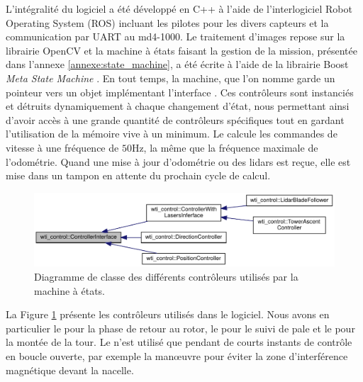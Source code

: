 L'intégralité du logiciel a été développé en C++ à l'aide de l'interlogiciel
Robot Operating System (ROS) incluant les pilotes pour les divers capteurs et la communication par UART au md4-1000. Le traitement d'images repose sur la librairie OpenCV \citep{itseez2015} et la machine à états faisant la gestion de la mission, présentée dans l'annexe \ref{annexe:state_machine}, a été écrite à l'aide de la librairie Boost \textit{Meta State Machine} \citep{Schling2011}. En tout temps, la machine, que l'on nomme  garde un pointeur vers un objet implémentant l'interface . Ces contrôleurs sont instanciés et détruits dynamiquement à chaque changement d'état, nous permettant ainsi d'avoir accès à une grande quantité de contrôleurs spécifiques tout en gardant l'utilisation de la mémoire vive à un minimum. Le  calcule les commandes de vitesse à une fréquence de $50$Hz, la même que la fréquence maximale de l'odométrie. Quand une mise à jour d'odométrie ou des lidars est reçue, elle est mise dans un tampon en attente du prochain cycle de calcul.

\begin{figure}[htbp]
  \centering
  \includegraphics[width=\linewidth]{images/uml_controller.pdf}
  \caption{Diagramme de classe des différents contrôleurs utilisés par la machine à états.}
  \label{fig:uml_controller}
\end{figure}

La Figure \ref{fig:uml_controller} présente les contrôleurs utilisés dans le logiciel. Nous avons en particulier le  pour la phase de retour au rotor, le  pour le suivi de pale et le  pour la montée de la tour. Le  n'est utilisé que pendant de courts instants de contrôle en boucle ouverte, par exemple la man\oe uvre pour éviter la zone d'interférence magnétique devant la nacelle.

